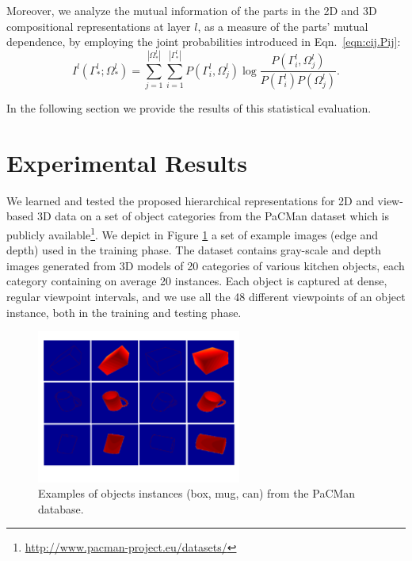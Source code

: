 \documentclass[runningheads]{llncs}
\begin{document}
Moreover, we analyze the mutual information of the parts in the 2D and 3D compositional representations at layer $l$, as a measure of the parts' mutual dependence, by employing the joint probabilities introduced in Eqn.~\ref{eqn:cij.Pij}:
\begin{equation}
 I^l(\Gamma_*^l;\Omega_*^l) = \sum\limits_{j=1}^{|\Omega_*^l|}\sum\limits_{i=1}^{|\Gamma_*^l|}P({\Gamma_i^l},\Omega_j^l)\log \frac{P({\Gamma_i^l},\Omega_j^l)}{P({\Gamma_i^l})P(\Omega_j^l)}.
\end{equation}

In the following section we provide the results of this statistical evaluation.

\section{Experimental Results}
\label{sec:results}

We learned and tested the proposed hierarchical representations for 2D and view-based 3D data on a set of object categories from the PaCMan dataset which is publicly available\footnote{\url{http://www.pacman-project.eu/datasets/}}. We depict in Figure \ref{database} a set of example images (edge and depth) used in the training phase. The dataset contains gray-scale and depth images generated from 3D models of 20 categories of various kitchen objects, each category containing on average 20 instances. Each object is captured at dense, regular viewpoint intervals, and we use all the 48 different viewpoints of an object instance, both in the training and testing phase.

\begin{figure}
\begin{center}
\includegraphics[width=0.6\textwidth]{database}
\end{center}
\caption{Examples of objects instances (box, mug, can) from the PaCMan database.}
\label{database}
\end{figure}
\end{document}
